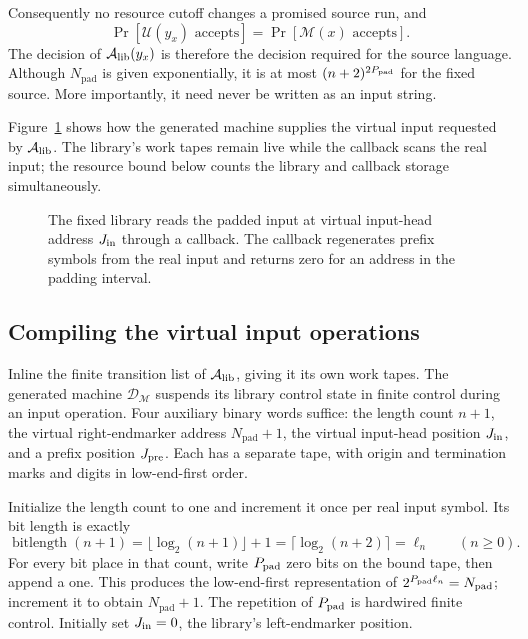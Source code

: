 Consequently no resource cutoff changes a promised source run, and
\begin{equation}\label{eq:compiler-exact-probability}
 \Pr[{\mathcal U}(y_x)\text{ accepts}]=\Pr[{\mathcal M}(x)\text{ accepts}].
\end{equation}
The decision of ${\mathcal A_{\rm lib}}(y_x)$ is therefore the decision required for the source language.
Although $N_{\mathrm{pad}}$ is given exponentially, it is at most
$(n+2)^{2{P_{\rm pad}}}$ for the fixed source.  More importantly, it need never
be written as an input string.



Figure~\ref{fig:compiler-padding} shows how the generated machine supplies
the virtual input requested by ${\mathcal A_{\rm lib}}$. The library's work tapes remain live
while the callback scans the real input; the resource bound below counts
the library and callback storage simultaneously.

\begin{figure}[tb]
 \centering
 
 \caption{The fixed library reads the padded input at virtual input-head
 address ${J_{\rm in}}$ through a callback.
 The callback regenerates prefix symbols from the real input and returns
 zero for an address in the padding interval.}
 \label{fig:compiler-padding}
\end{figure}

\subsection{Compiling the virtual input operations}
\label{subsec:compiler-callback}

Inline the finite transition list of ${\mathcal A_{\rm lib}}$, giving it its own work tapes.
The generated machine ${\mathcal D_{\mathcal M}}$ suspends its library control state in finite
control during an input operation.  Four auxiliary binary words suffice:
the length count $n+1$, the virtual right-endmarker address
$N_{\mathrm{pad}}+1$, the virtual input-head position ${J_{\rm in}}$, and a prefix
position ${J_{\rm pre}}$.  Each has a separate tape, with origin and termination
marks and digits in low-end-first order.

Initialize the length count to one and increment it once per real input
symbol.  Its bit length is exactly
\begin{equation}\label{eq:compiler-bitlength}
 \operatorname{bitlength}(n+1)
   =\lfloor\log_2(n+1)\rfloor+1
   =\lceil\log_2(n+2)\rceil=\ell_n
 \qquad(n\ge0).
\end{equation}
For every bit place in that count, write ${P_{\rm pad}}$ zero bits on the bound tape,
then append a one.  This produces the low-end-first representation of
$2^{P_{\rm pad}\ell_n}=N_{\mathrm{pad}}$; increment it to obtain
$N_{\mathrm{pad}}+1$.  The repetition of ${P_{\rm pad}}$ is hardwired finite control.
Initially set ${J_{\rm in}}=0$, the library's left-endmarker position.

